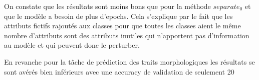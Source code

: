 \documentclass[a4paper]{article}
\begin{document}
On constate que les résultats sont moins bons que pour la méthode $separate_0$ et que le modèle a besoin de plus d'epochs. Cela s'explique par le fait que les attributs fictifs rajoutés aux classes 
pour que toutes les classes aient le même nombre d'attributs sont des attributs inutiles qui n'apportent pas d'information au modèle et qui peuvent donc le perturber.















En revanche pour la tâche de prédiction des traits morphologiques les résultats se sont avérés bien inférieurs avec une accuracy de validation de seulement 20%
\end{document}

